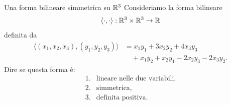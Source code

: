 \documentclass[a4paper]{article}
\begin{document}
\begin{snippetexercise}{Una forma bilineare simmetrica su \(\mathbb{R}^3\)}
    Consideriamo la forma bilineare
    \[
        \langle\cdot,\cdot\rangle:\mathbb{R}^3\times\mathbb{R}^3\to\mathbb{R}
    \]
    definita da
    \begin{align*}
        \langle (x_1,x_2,x_3),(y_1,y_2,y_3)\rangle
        &=
        x_1y_1+3x_2y_2+4x_3y_3\\
        &\quad
        +x_1y_2+x_2y_1-2x_2y_3-2x_3y_2.
    \end{align*}
    Dire se questa forma è:
    \[
        \begin{array}{ll}
            \text{1.} & \text{lineare nelle due variabili},\\
            \text{2.} & \text{simmetrica},\\
            \text{3.} & \text{definita positiva}.
        \end{array}
    \]
\end{snippetexercise}
\end{document}
